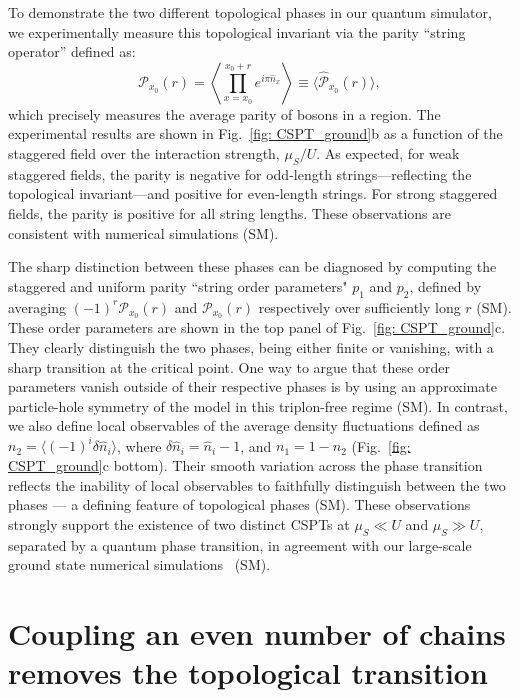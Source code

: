 \documentclass[preprint,superscriptaddress,floatfix, nofootinbib]{revtex4-2}
\begin{document}
To demonstrate the two different topological phases in our quantum simulator, we experimentally measure \cite{Hilker17, Wei23} this topological invariant via the parity ``string operator'' defined as:
\begin{equation}
\label{eq: POP}
\mathcal{P}_{x_0}(r) =  \left\langle \prod_{x=x_0}^{x_0+r} e^{i\pi \hat n_x}\right\rangle \equiv \langle \hat{\mathcal{P}}_{x_0}(r) \rangle,
\end{equation}
which precisely measures the average parity of bosons in a region.
%
The experimental results are shown in Fig.~\ref{fig: CSPT_ground}b as a function of the staggered field over the interaction strength, $\mu_S/U$.
%
As expected, for weak staggered fields, the parity is negative for odd-length strings---reflecting the topological invariant---and positive for even-length strings.
For strong staggered fields, the parity is positive for all string lengths.
These observations are consistent with numerical simulations (SM).

The sharp distinction between these phases can be diagnosed by computing the staggered and uniform parity ``string order parameters" $p_1$ and $p_2$, defined by averaging $(-1)^{r} \mathcal{P}_{x_0}(r)$ and $\mathcal{P}_{x_0}(r)$ respectively over sufficiently long $r$ (SM).
%
These order parameters are shown in the top panel of Fig.~\ref{fig: CSPT_ground}c. They clearly distinguish the two phases, being either finite or vanishing, with a sharp transition at the critical point.
%
One way to argue that these order parameters vanish outside of their respective phases is by using an approximate particle-hole symmetry of the model in this triplon-free regime (SM).
%
In contrast, we also define local observables of the average density fluctuations defined as $n_2= \langle (-1)^i\delta\hat{n}_i\rangle $, where $\delta \hat{n}_i=\hat{n}_i-1$, and $n_1= 1 - n_2$ (Fig.~\ref{fig: CSPT_ground}c bottom). Their smooth variation across the phase transition reflects the inability of local observables to faithfully distinguish between the two phases --- a defining feature of topological phases (SM). These observations strongly support the existence of two distinct CSPTs at $\mu_S \ll U$ and $\mu_S \gg U$, separated by a quantum phase transition, in agreement with our large-scale ground state numerical simulations~\cite{Sahay2025} (SM).

\section{Coupling an even number of chains removes the topological transition}
\end{document}
